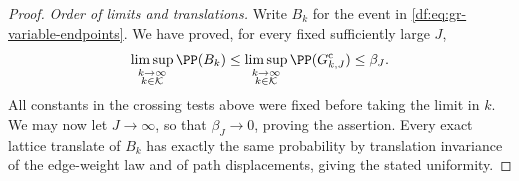 \begin{proof}
\emph{Order of limits and translations.}
Write $B_k$ for the event in \eqref{df:eq:gr-variable-endpoints}. We have
proved, for every fixed sufficiently large $J$,
\[
 \limsup_{\substack{k\to\infty\\k\in\mathcal K}}\PP(B_k)
 \leq\limsup_{\substack{k\to\infty\\k\in\mathcal K}}
       \PP(G_{k,J}^{\mathrm c})
 \leq\beta_J.
\]
All constants in the crossing tests above were fixed before taking
the limit in $k$. We may now let $J\to\infty$, so that
$\beta_J\to0$, proving the assertion. Every exact lattice
translate of $B_k$ has exactly the same probability by translation
invariance of the edge-weight law and of path displacements, giving
the stated uniformity.
\end{proof}

